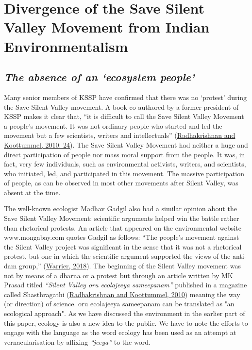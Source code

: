 \documentclass[twoside, 13pt]{article}
\begin{document}
{{{{\fontsize{18}{20}\selectfont\section*{Divergence of the Save Silent Valley Movement from Indian Environmentalism}}

\vspace{-.3cm}

{\fontsize{8}{10}\selectfont \subsection*{\textit{The absence of an ‘ecosystem people’}}}

{\fontsize{12}{14}\selectfont Many senior members of KSSP have confirmed that there was no ‘protest’ during the Save Silent Valley movement. A book co-authored by a former president of KSSP makes it clear that, “it is difficult to call the Save Silent Valley Movement a people’s movement. It was not ordinary people who started and led the movement but a few scientists, writers and intellectuals” (\underline{Radhakrishnan and Koottummel, 2010: 24}). The Save Silent Valley Movement had neither a huge and direct participation of people nor mass moral support from the people. It was, in fact, very few individuals, such as environmental activists, writers, and scientists, who initiated, led, and participated in this movement. The massive participation of people, as can be observed in most other movements after Silent Valley, was absent at the time.


The well-known ecologist Madhav Gadgil also had a similar opinion about the Save Silent Valley Movement: scientific arguments helped win the battle rather than rhetorical protests. An article that appeared on the environmental website www.mongabay.com quotes Gadgil as follows: “The people’s movement against the Silent Valley project was significant in the sense that it was not a rhetorical protest, but one in which the scientific argument supported the views of the anti-dam group,” (\underline{Warrier, 2018}). The beginning of the Silent Valley movement was not by means of a dharna or a protest but through an article written by MK Prasad titled \textit{“Silent Valley oru ecolajeeya sameepanam”} published in a magazine called Shasthragathi (\underline{Radhakrishnan and Koottummel, 2010}) meaning the way (or direction) of science. oru ecolajeeya sameepanam can be translated as "an ecological approach". As we have discussed the environment in the earlier part of this paper, ecology is also a new idea to the public. We have to note the efforts to engage with the language as the word ecology has been used as an attempt at vernacularisation by affixing \textit{“jeeya”} to the word. 


}}}}
\end{document}
